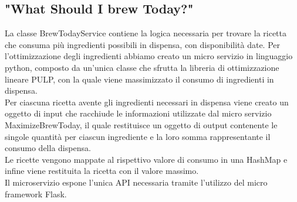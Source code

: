 \documentclass{article}
\begin{document}
\subsection{"What Should I brew Today?"}
La classe BrewTodayService contiene la logica necessaria per trovare la ricetta che consuma più ingredienti possibili in dispensa, con disponibilità date. Per l’ottimizzazione degli ingredienti abbiamo creato un micro servizio in linguaggio python, composto da un’unica classe che sfrutta la libreria di ottimizzazione lineare PULP, con la quale viene massimizzato il consumo di ingredienti in dispensa.\\
Per ciascuna ricetta avente gli ingredienti necessari in dispensa viene creato un oggetto di input che racchiude le informazioni utilizzate dal micro servizio MaximizeBrewToday, il quale restituisce un oggetto di output contenente le singole quantità per ciascun ingrediente e la loro somma rappresentante il consumo della dispensa.\\
Le ricette vengono mappate al rispettivo valore di consumo in una HashMap e infine viene restituita la ricetta con il valore massimo.\\
Il microservizio espone l’unica API necessaria tramite l’utilizzo del micro framework Flask.
\clearpage
\end{document}
